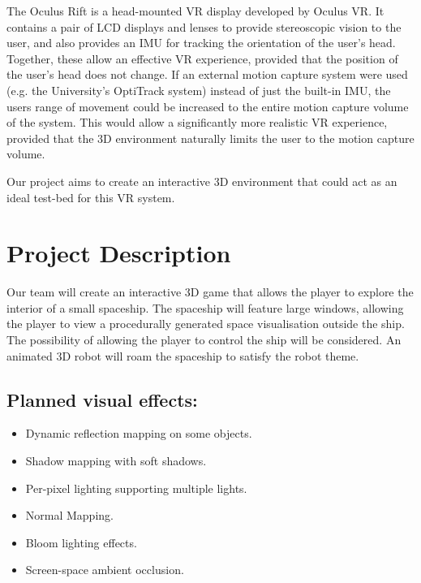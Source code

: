 \documentclass[11pt]{scrartcl} %
\begin{document}
    The Oculus Rift is a head-mounted VR display developed by Oculus VR. It
    contains a pair of LCD displays and lenses to provide stereoscopic vision to
    the user, and also provides an IMU for tracking the orientation of the user's
    head. Together, these allow an effective VR experience, provided that the
    position of the user's head does not change. If an external motion capture
    system were used (e.g. the University's OptiTrack system) instead of just the
    built-in IMU, the users range of movement could be increased to the entire
    motion capture volume of the system. This would allow a significantly more
    realistic VR experience, provided that the 3D environment naturally limits the
    user to the motion capture volume.

    Our project aims to create an interactive 3D environment that could act as an
    ideal test-bed for this VR system.

\section*{Project Description}
    
    Our team will create an interactive 3D game that allows the player to
    explore the interior of a small spaceship. The spaceship will feature large
    windows, allowing the player to view a procedurally generated space
    visualisation outside the ship.
    The possibility of allowing the player to control the ship will be
    considered.
    An animated 3D robot will roam the spaceship to satisfy the robot theme.

    \subsection*{Planned visual effects:}
    \begin{itemize}
        \item Dynamic reflection mapping on some objects.
        \item Shadow mapping with soft shadows.
        \item Per-pixel lighting supporting multiple lights.
        \item Normal Mapping.
        \item Bloom lighting effects.
        \item Screen-space ambient occlusion.
    \end{itemize}
\end{document}
